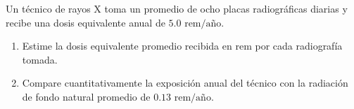 \item Un técnico de rayos X toma un promedio de ocho placas radiográficas diarias y recibe una dosis equivalente anual de $5.0\text{ rem/año}$.
\begin{enumerate}
    \item Estime la dosis equivalente promedio recibida en rem por cada radiografía tomada.
    \item Compare cuantitativamente la exposición anual del técnico con la radiación de fondo natural promedio de $0.13\text{ rem/año}$.
\end{enumerate}